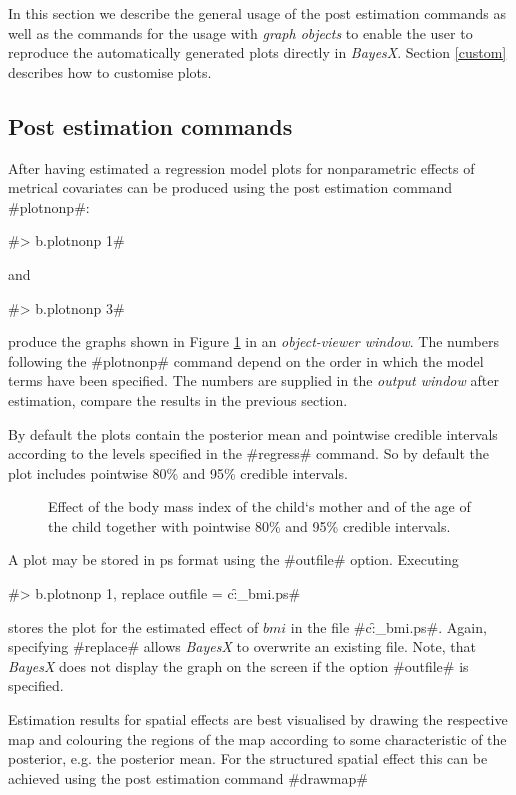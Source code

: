 \documentclass{article}
\begin{document}
In this section we describe the general usage of the post
estimation commands as well as the commands for the usage with
{\em graph objects} to enable the user to reproduce the
automatically generated plots directly in {\em BayesX}. Section
\ref{custom} describes how to customise plots.

\subsection{Post estimation commands}

After having estimated a regression model plots for nonparametric
effects of metrical covariates can be produced using the post
estimation command #plotnonp#:

#> b.plotnonp 1#

and

#> b.plotnonp 3#

produce the graphs shown in Figure \ref{bmi1} in an {\it
object-viewer window}. The numbers following the #plotnonp#
command depend on the order in which the model terms have been
specified. The numbers are supplied in the {\em output window}
after estimation, compare the results in the previous section.

By default the plots contain the posterior mean and pointwise
credible intervals according to the levels specified in the
#regress# command. So by default the plot includes pointwise 80\%
and 95\% credible intervals.

\begin{figure}[ht]
\begin{center}
 {\it\caption{Effect of
the body mass index of the child`s mother and of the age of the
child together with pointwise 80\% and 95\% credible intervals.
\label{bmi1}}}
\end{center}
\end{figure}

A plot may be stored in ps format using the #outfile# option.
Executing

#> b.plotnonp 1, replace outfile = c:\data\f_bmi.ps#

stores the plot for the estimated effect of $bmi$ in the file
#c:\data\f_bmi.ps#. Again, specifying #replace# allows {\it
BayesX} to overwrite an existing file. Note, that {\it BayesX}
does not display the graph on the screen if the option #outfile#
is specified.

Estimation results for spatial effects are best visualised by
drawing the respective map and colouring the regions of the map
according to some characteristic of the posterior, e.g. the
posterior mean. For the structured spatial effect this can be
achieved using the post estimation command #drawmap#
\end{document}
